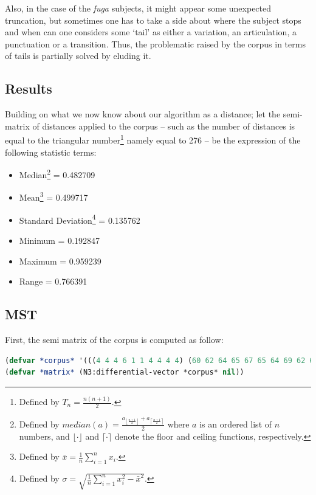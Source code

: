 \smallskip

Also, in the case of the \textit{fuga} subjects, it might appear some unexpected truncation, but sometimes one has to take a side about where the subject stops and when can one considers some `tail' as either a variation, an articulation, a punctuation or a transition. Thus, the problematic raised by the corpus in terms of tails is partially solved by eluding it.

\subsection{Results}

Building on what we now know about our algorithm as a distance; let the semi-matrix of distances applied to the corpus -- such as the number of distances is equal to the triangular number\footnote{Defined by $T_n=\displaystyle\frac{n(n+1)}{2}$.} namely equal to 276 -- be the expression of the following statistic terms:

\begin{itemize}
\item[] Median\footnote{Defined by $median(a)=\displaystyle\frac{a_{\left \lfloor{\frac{n+1}{2}}\right \rfloor } + a_{\left \lceil{\frac{n+1}{2}}\right \rceil }}{2}$ where $a$ is an ordered list of $n$ numbers, and $\displaystyle \lfloor \cdot \rfloor$  and $\displaystyle \lceil \cdot \rceil$  denote the floor and ceiling functions, respectively.}  = 0.482709
\item[] Mean\footnote{Defined by $\bar{x}=\displaystyle\frac{1}{n}\sum_{i=1}^n x_i$.}  = 0.499717
\item[] Standard Deviation\footnote{Defined by $\sigma=\displaystyle\sqrt{\frac{1}{n}\sum_{i=1}^n x^2_i - \bar{x}^2}$.}  =  0.135762
\item[] Minimum = 0.192847 
\item[] Maximum = 0.959239
\item[] Range = 0.766391
\end{itemize}

\subsection{MST}

First, the semi matrix of the corpus is computed as follow:
\begin{lstlisting}[language=Lisp]
(defvar *corpus* '(((4 4 4 6 1 1 4 4 4 4) (60 62 64 65 67 65 64 69 62 67)) ...))
(defvar *matrix* (N3:differential-vector *corpus* nil))
\end{lstlisting}

